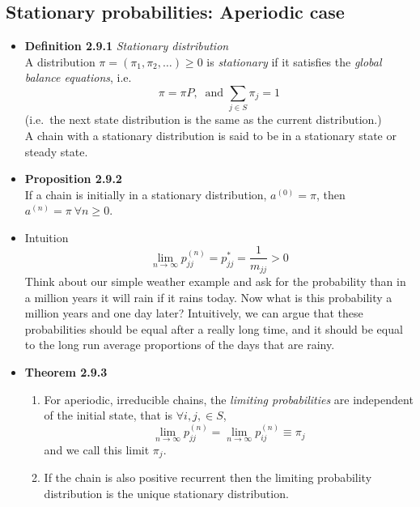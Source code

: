 \documentclass[11pt,a4paper]{article}
\begin{document}
\subsection{Stationary probabilities: Aperiodic case}
\begin{itemize}
	\item \textbf{Definition 2.9.1} \emph{Stationary distribution} \\
		A distribution $\pi = (\pi_1, \pi_2, \ldots) \geq 0$ is \emph{stationary} if it satisfies the \emph{global balance equations}, i.e.
		$$\pi = \pi P,\ \text{ and } \sum_{j \in S} \pi_j = 1$$
		(i.e.\ the next state distribution is the same as the current distribution.)\\
		A chain with a stationary distribution is said to be in a stationary state or steady state.
	\item \textbf{Proposition 2.9.2} \\
		If a chain is initially in a stationary distribution, $a^{(0)} = \pi$, then $a^{(n)} = \pi \ \forall n \geq 0$.
	\item Intuition
		$$\lim_{n \to \infty} p_{jj}^{(n)} = p_{jj}^* = \frac{1}{m_{jj}} > 0$$
		Think about our simple weather example and ask for the probability than in a million years it will rain if it rains today.
		Now what is this probability a million years and one day later?
		Intuitively, we can argue that these probabilities should be equal after a really long time,
		and it should be equal to the long run average proportions of the days that are rainy.
	\item \textbf{Theorem 2.9.3}
		\begin{enumerate}
			\item For aperiodic, irreducible chains, the \emph{limiting probabilities} are independent of the initial state, that is $\forall i, j, \in S$,
				$$\lim_{n \to \infty}p_{jj}^{(n)} = \lim_{n \to \infty} p_{ij}^{(n)} \equiv \pi_j$$
				and we call this limit $\pi_j$.
			\item If the chain is also positive recurrent then the limiting probability distribution is the unique stationary distribution.
		\end{enumerate}
\end{itemize}
\end{document}
